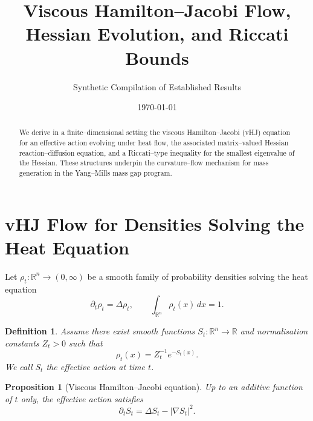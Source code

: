 \documentclass[11pt]{article}
\title{Viscous Hamilton--Jacobi Flow, Hessian Evolution, and Riccati Bounds}
\author{Synthetic Compilation of Established Results}
\date{\today}
\newtheorem{proposition}[theorem]{Proposition}
\newtheorem{definition}[theorem]{Definition}
\begin{document}
\maketitle

\begin{abstract}
We derive in a finite--dimensional setting the viscous
Hamilton--Jacobi (vHJ) equation for an effective action evolving under
heat flow, the associated matrix--valued Hessian reaction--diffusion
equation, and a Riccati--type inequality for the smallest eigenvalue of
the Hessian. These structures underpin the curvature--flow mechanism
for mass generation in the Yang--Mills mass gap program.
\end{abstract}

\section{vHJ Flow for Densities Solving the Heat Equation}

Let $\rho_t:\mathbb{R}^n\to(0,\infty)$ be a smooth family of probability
densities solving the heat equation
\begin{equation}
  \partial_t\rho_t = \Delta\rho_t,
  \qquad \int_{\mathbb{R}^n}\rho_t(x)\,dx = 1.
\end{equation}

\begin{definition}
Assume there exist smooth functions $S_t:\mathbb{R}^n\to\mathbb{R}$ and
normalisation constants $Z_t>0$ such that
\begin{equation}
  \rho_t(x) = Z_t^{-1}e^{-S_t(x)}.
\end{equation}
We call $S_t$ the \emph{effective action} at time $t$.
\end{definition}

\begin{proposition}[Viscous Hamilton--Jacobi equation]
Up to an additive function of $t$ only, the effective action satisfies
\begin{equation}
  \partial_t S_t = \Delta S_t - |\nabla S_t|^2.
\end{equation}
\end{proposition}
\end{document}
